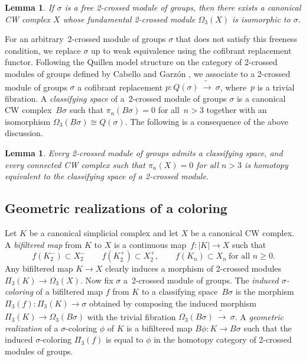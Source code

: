 \documentclass[a4paper, oneside]{amsart}
\numberwithin{equation}{subsection}
\theoremstyle{referencedlemma}
\theoremstyle{plain} %
\newtheorem{lem}[equation]{Lemma}
\theoremstyle{remark}
\begin{document}
\begin{lem}
If $\sigma$ is a free 2-crossed module of groups, then there exists a canonical CW complex $X$ whose fundamental 2-crossed module $\Omega_3(X)$ is isomorphic to $\sigma$. 
\end{lem}

For an arbitrary~2-crossed module of groups $\sigma$ that does not satisfy this freeness condition, we replace $\sigma$ up to weak equivalence using the cofibrant replacement functor.  Following the Quillen model structure on the category of 2-crossed modules of groups defined by Cabello and Garzón \cite{cabello1994quillen}, we associate to a 2-crossed module of groups $\sigma$ a cofibrant replacement $p \colon Q(\sigma) \ \tilde{\to}\ \sigma$, where~$p$ is a trivial fibration. A \emph{classifying space} of a~2-crossed module of groups $\sigma$ is a canonical CW complex~$B\sigma$ such that $\pi_n(B\sigma) = 0$ for all~$n>3$ together with an isomorphism $\Omega_3(B\sigma) \cong Q(\sigma)$.  The following is a consequence of the above discussion.

\begin{lem}
Every 2-crossed module of groups admits a classifying space, and every connected CW complex such that $\pi_n(X) = 0$ for all $n>3$ is homotopy equivalent to the classifying space of a 2-crossed module. 
\end{lem}


\subsection{Geometric realizations of a coloring}\label{geometric realization}
Let $K$ be a canonical simplicial complex and let $X$ be a canonical CW complex.  A \emph{bifiltered map} from $K$ to $X$ is a continuous map~$f\colon \lvert K\rvert \to X$ such that 
$$
f(K_2^-)\subset X_2^- \quad \quad f(K_2^+) \subset X_2^+, \quad \quad f(K_n) \subset X_n\  \text{for all $n\geqslant 0$}. 
$$
Any bifiltered map $K\to X$ clearly induces a morphism of 2-crossed modules $\Pi_3(K) \to \Omega_3(X)$.  Now fix $\sigma$ a~\mbox{2-crossed} module of groups.  The \emph{induced $\sigma$-coloring} of a bifiltered map $f$ from $K$ to a classifying space~$B\sigma$ is the morphism $\Pi_3(f) \colon \Pi_3(K) \to \sigma$ obtained by composing the induced morphism~$\Pi_3(K) \to \Omega_3(B\sigma)$ with the trivial fibration $\Omega_3(B\sigma)\  \tilde{\to}\  \sigma$. A \emph{geometric realization} of a $\sigma$-coloring $\phi$ of $K$ is a bifiltered map $B\phi\colon K\to B\sigma$ such that the induced $\sigma$-coloring $\Pi_3(f)$ is equal to $\phi$ in the homotopy category of 2-crossed modules of groups. 
\end{document}
